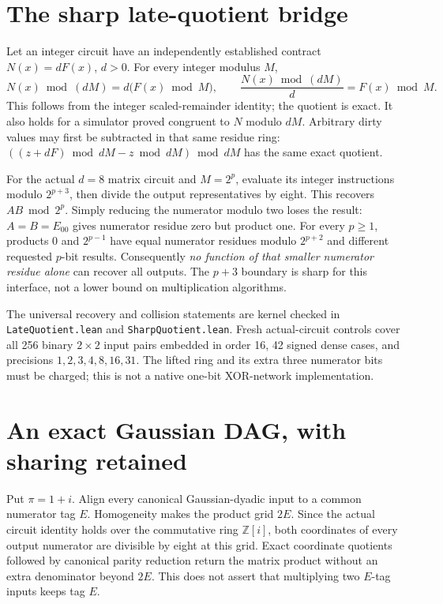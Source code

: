 \documentclass[11pt]{article}
\newcommand{\Gi}{\mathbb Z[i]}
\newcommand{\pii}{\pi}
\begin{document}
\section{The sharp late-quotient bridge}
Let an integer circuit have an independently established contract
$N(x)=dF(x)$, $d>0$. For every integer modulus $M$,
\begin{equation}\label{eq:quotient}
 N(x)\bmod(dM)=d\bigl(F(x)\bmod M\bigr),\qquad
 \frac{N(x)\bmod(dM)}d=F(x)\bmod M.
\end{equation}
This follows from the integer scaled-remainder identity; the quotient is
exact. It also holds for a simulator proved congruent to $N$ modulo $dM$.
Arbitrary dirty values may first be subtracted in that same residue ring:
$((z+dF)\bmod dM-z\bmod dM)\bmod dM$ has the same exact quotient.

For the actual $d=8$ matrix circuit and $M=2^p$, evaluate its integer
instructions modulo $2^{p+3}$, then divide the output representatives by
eight. This recovers $AB\bmod2^p$. Simply reducing the numerator modulo two
loses the result: $A=B=E_{00}$ gives numerator residue zero but product one.
For every $p\ge1$, products $0$ and $2^{p-1}$ have equal numerator residues
modulo $2^{p+2}$ and different requested $p$-bit results. Consequently
\emph{no function of that smaller numerator residue alone} can recover all
outputs. The $p+3$ boundary is sharp for this interface, not a lower bound
on multiplication algorithms.

The universal recovery and collision statements are kernel checked in
\texttt{LateQuotient.lean} and \texttt{SharpQuotient.lean}. Fresh actual-circuit
controls cover all 256 binary $2\times2$ input pairs embedded in order 16,
42 signed dense cases, and precisions $1,2,3,4,8,16,31$. The lifted ring and
its extra three numerator bits must be charged; this is not a native
one-bit XOR-network implementation.

\section{An exact Gaussian DAG, with sharing retained}
Put $\pii=1+i$. Align every canonical Gaussian-dyadic input to a common
numerator tag $E$. Homogeneity makes the product grid $2E$. Since the
actual circuit identity holds over the commutative ring $\Gi$, both
coordinates of every output numerator are divisible by eight at this
grid. Exact coordinate quotients followed by canonical parity reduction
return the matrix product without an extra denominator beyond $2E$.
This does not assert that multiplying two $E$-tag inputs keeps tag $E$.
\end{document}
